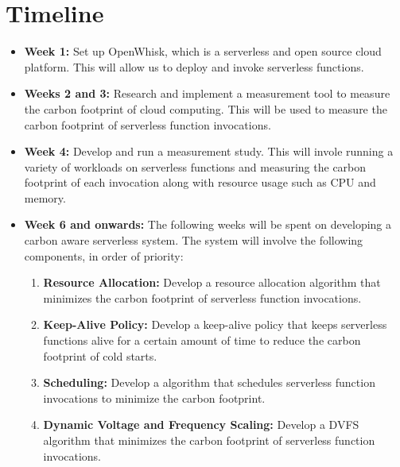 \documentclass[times, 10pt]{article}
\begin{document}
\section{Timeline}
\begin{itemize}
    \item \textbf{Week 1:} Set up OpenWhisk, which is a serverless and open source cloud platform. This will allow us to deploy and invoke serverless functions.
    \item \textbf{Weeks 2 and 3:} Research and implement a measurement tool to measure the carbon footprint of cloud computing. This will be used to measure the carbon footprint of serverless function invocations.
    \item \textbf{Week 4:} Develop and run a measurement study. This will invole running a variety of workloads on serverless functions and measuring the carbon footprint of each invocation along with resource usage such as CPU and memory.
    \item \textbf{Week 6 and onwards:} The following weeks will be spent on developing a carbon aware serverless system. The system will involve the following components, in order of priority:
    \begin{enumerate}
      \item \textbf{Resource Allocation:} Develop a resource allocation algorithm that minimizes the carbon footprint of serverless function invocations.
      \item \textbf{Keep-Alive Policy:} Develop a keep-alive policy that keeps serverless functions alive for a certain amount of time to reduce the carbon footprint of cold starts.
      \item \textbf{Scheduling:} Develop a algorithm that schedules serverless function invocations to minimize the carbon footprint.
      \item \textbf{Dynamic Voltage and Frequency Scaling:} Develop a DVFS algorithm that minimizes the carbon footprint of serverless function invocations.
    \end{enumerate}
\end{itemize}
\end{document}
